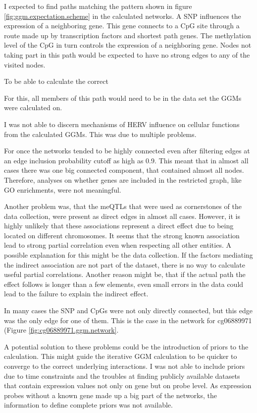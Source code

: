 \documentclass[a4paper,12pt,twoside,openright]{article}
\begin{document}

I expected to find paths matching the pattern shown in figure \ref{fig:ggm.expectation.scheme} in the calculated networks.  A SNP influences the expression of a neighboring gene. This gene connects to a CpG site through a route made up by transcription factors and shortest path genes. The methylation level of the CpG in turn controls the expression of a neighboring gene. Nodes not taking part in this path would be expected to have no strong edges to any of the visited nodes. 

To be able to calculate the correct 

For this, all members of this path would need to be in the data set the GGMs were calculated on. 

I was not able to discern mechanisms of HERV influence on cellular functions from the calculated GGMs. This was due to multiple problems. 

For once the networks tended to be highly connected even after filtering edges at an edge inclusion probability cutoff as high as 0.9. This meant that in almost all cases there was one big connected component, that contained almost all nodes. Therefore, analyses on whether genes are included in the restricted graph, like GO enrichments, were not meaningful. 

Another problem was, that the meQTLs that were used as cornerstones of the data collection, were present as direct edges in almost all cases. However, it is highly  unlikely that these associations represent a direct effect due to being located on different chromosomes. It seems that the strong known association lead to strong partial correlation even when respecting all other entities. A possible explanation for this might be the data collection. If the factors mediating the indirect association are not part of the dataset, there is no way to calculate useful partial correlations. Another reason might be, that if the actual path the effect follows is longer than a few elements, even small errors in the data could lead to the failure to explain the indirect effect. 

In many cases the SNP and CpGs were not only directly connected, but this edge was the only edge for one of them. This is the case in the network for cg06889971 (Figure \ref{fig:cg06889971.ggm.network}.

A potential solution to these problems could be the introduction of priors to the calculation. This might guide the iterative GGM calculation to be quicker to converge to the correct underlying interactions. I was not able to include priors due to time constraints and the troubles at finding publicly available datasets that contain expression values not only on gene but on probe level. As expression probes without a known gene made up a big part of the networks, the information to define complete priors was not available. 
\end{document}
